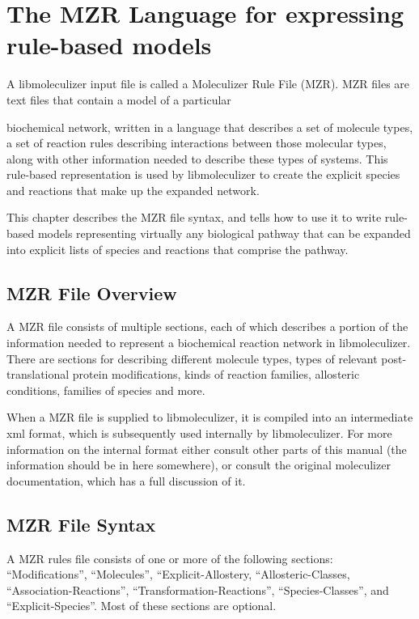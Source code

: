 \chapter{The MZR Language for expressing rule-based models}
\label{chap:theRulesChapter}
A libmoleculizer input file is called a Moleculizer Rule File (MZR).
MZR files are text files that contain a model of a particular

biochemical network, written in a language that describes a set of
molecule types, a set of reaction rules describing interactions
between those molecular types, along with other information needed to
describe these types of systems.  This rule-based representation is
used by libmoleculizer to create the explicit species and reactions
that make up the expanded network.

This chapter describes the MZR file syntax, and tells how to use it to
write rule-based models representing virtually any biological pathway
that can be expanded into explicit lists of species and reactions that
comprise the pathway.  

\section{MZR File Overview}
A MZR file consists of multiple sections, each of which describes a
portion of the information needed to represent a biochemical reaction
network in libmoleculizer.  There are sections for describing
different molecule types, types of relevant post-translational protein
modifications, kinds of reaction families, allosteric conditions,
families of species and more.

When a MZR file is supplied to libmoleculizer, it is compiled into an
intermediate xml format, which is subsequently used internally by
libmoleculizer.  For more information on the internal format either
consult other parts of this manual (the information should be in here
somewhere), or consult the original moleculizer documentation, which
has a full discussion of it.

\section{MZR File Syntax}
A MZR rules file consists of one or more of the following sections:
``Modifications'', ``Molecules'', ``Explicit-Allostery, ``Allosteric-Classes,
``Association-Reactions'', ``Transformation-Reactions'', ``Species-Classes'', and
``Explicit-Species''.  Most of these sections are optional.

